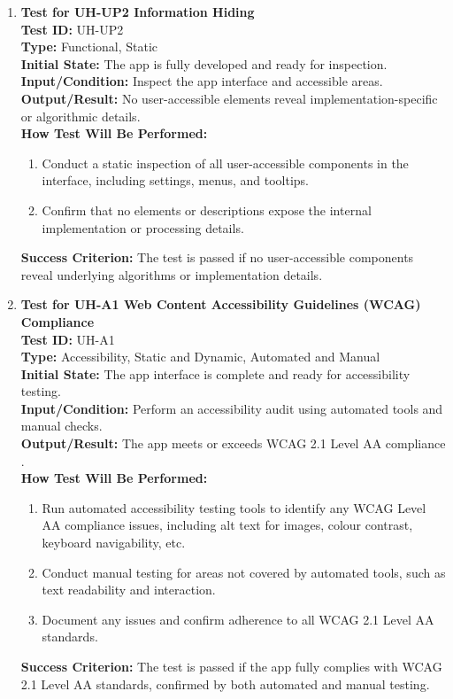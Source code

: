 \documentclass[12pt, titlepage]{article}
\begin{document}
\begin{enumerate}
    \item \textbf{Test for UH-UP2 Information Hiding} \\
      \newline
      \textbf{Test ID:} UH-UP2 \\
      \textbf{Type:} Functional, Static \\
      \textbf{Initial State:} The app is fully developed and ready for inspection. \\
      \textbf{Input/Condition:} Inspect the app interface and accessible areas. \\
      \textbf{Output/Result:} No user-accessible elements reveal implementation-specific or algorithmic details. \\
      \textbf{How Test Will Be Performed:}
      \begin{enumerate}
          \item Conduct a static inspection of all user-accessible components in the interface, including settings, menus, and tooltips.
          \item Confirm that no elements or descriptions expose the internal implementation or processing details.
      \end{enumerate}
      \textbf{Success Criterion:} The test is passed if no user-accessible components reveal underlying algorithms or implementation 
      details.

    \item \textbf{Test for UH-A1 Web Content Accessibility Guidelines (WCAG) Compliance} \\
      \newline
      \textbf{Test ID:} UH-A1 \\
      \textbf{Type:} Accessibility, Static and Dynamic, Automated and Manual \\
      \textbf{Initial State:} The app interface is complete and ready for accessibility testing. \\
      \textbf{Input/Condition:} Perform an accessibility audit using automated tools and manual checks. \\
      \textbf{Output/Result:} The app meets or exceeds WCAG 2.1 Level AA compliance \citep*{WCAG21}. \\
      \textbf{How Test Will Be Performed:}
      \begin{enumerate}
          \item Run automated accessibility testing tools to identify any WCAG Level AA compliance issues, including alt text for 
          images, colour contrast, keyboard navigability, etc.
          \item Conduct manual testing for areas not covered by automated tools, such as text readability and interaction.
          \item Document any issues and confirm adherence to all WCAG 2.1 Level AA standards.
      \end{enumerate}
      \textbf{Success Criterion:} The test is passed if the app fully complies with WCAG 2.1 Level AA standards, confirmed by both 
      automated and manual testing.
\end{enumerate}
\end{document}
